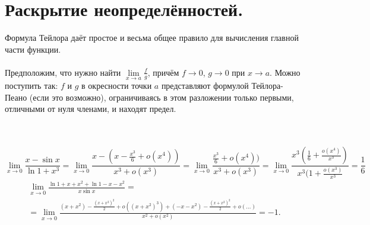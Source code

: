 	\section{Раскрытие неопределённостей.}
	Формула Тейлора даёт простое и весьма общее правило для вычисления главной части функции.\\\\
	Предположим, что нужно найти $ \lim\limits_{x \to a} \frac{f}{g}$, причём $f \rightarrow 0$, $g \rightarrow 0$ при $x \rightarrow a$.
	Можно поступить так:
	$f$ и $g$ в окресности точки $a$ представляют формулой Тейлора-Пеано (если это возможно), ограничиваясь в этом разложении только первыми, отличными от нуля членами, и находят предел.\\\\
	\begin{example}\\ 
		$$\lim\limits_{x \rightarrow 0}\frac{x - \sin x}{\ln{1 + x^3}} = \lim\limits_{x \rightarrow 0}\frac{x - (x - \frac{x^3}{6} + o(x^4))}{x^3 + o(x^3)} = \lim\limits_{x \rightarrow 0}\frac{\frac{x^3}{6} + o(x^4))}{x^3 + o(x^3)}
		= \lim\limits_{x \rightarrow 0}\frac{x^3(\frac{1}{6} + \frac{o(x^4)}{x^3} )}{x^3(1 + \frac{o(x^3)}{x^3}} = \frac{1}{6}$$
		\begin{multline*}
			\lim\limits_{x \rightarrow 0}\frac{\ln{1 + x + x^2} + \ln{1 - x  - x^2}}{x\sin x} =\\= \lim\limits_{x \rightarrow 0}\frac{(x + x^2) - \frac{{(x + x^2)}^2}{2} + o({(x + x^2)}^3) + (-x - x^2) - \frac{{(x + x^2)}^2}{2} + o(\ldots)}{x^2 + o(x^2)} = -1.
		\end{multline*}
	\end{example}
